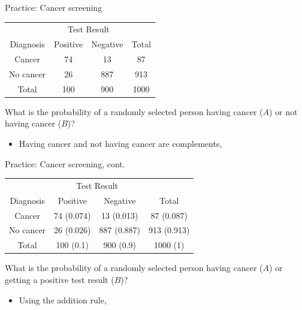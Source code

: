 \documentclass[xcolor=table, aspectratio=169, bigger, handout]{beamer}
\begin{document}
\begin{frame}{Practice: Cancer screening}
\begin{block}{}
{\centering
\begin{tabular}{c | c  c | c}
\multicolumn{1}{c}{} & \multicolumn{2}{c}{Test Result}\\
Diagnosis & Positive & Negative & Total \\
\hline
Cancer & 74 & 13 & 87\\
No cancer & 26 & 887 & 913\\
\hline
Total & 100 & 900 & 1000
\end{tabular}\par
}
\end{block}

\begin{exampleblock}{}
What is the probability of a randomly selected person having cancer ($A$) or not having cancer ($B$)?

\begin{itemize}
\pause
\item Having cancer and not having cancer are complements,\\
\smallskip{}
\end{itemize}
\end{exampleblock}
\end{frame}

\begin{frame}{Practice: Cancer screening, cont.}
\begin{block}{}
{\centering
\begin{tabular}{c | c  c | c}
\multicolumn{1}{c}{} & \multicolumn{2}{c}{Test Result}\\
Diagnosis & Positive & Negative & Total \\
\hline
Cancer & 74 (0.074) & 13 (0.013) & 87 (0.087)\\
No cancer & 26 (0.026) & 887 (0.887) & 913 (0.913)\\
\hline
Total & 100 (0.1) & 900 (0.9) & 1000 (1)
\end{tabular}\par
}
\end{block}

\begin{exampleblock}{}
What is the probability of a randomly selected person having cancer ($A$) or getting a positive test result ($B$)?

\begin{itemize}
\pause
\item Using the addition rule,\\
\smallskip{}
\pause{}
\end{itemize}
\end{exampleblock}
\end{frame}
\end{document}
